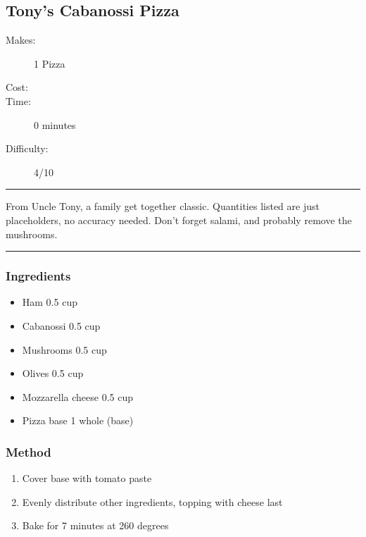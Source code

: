 \documentclass[]{article}
\begin{document}
\subsection*{\center\huge Tony's Cabanossi Pizza}
\begin{description}
\item[Makes:] 1 Pizza
\item[Cost:] \textdollar
\item[Time:] 0 minutes
\item[Difficulty:] 4/10
\end{description}
\vspace{0.2cm}\hrule\vspace{0.5cm}
\begin{adjustwidth}{0.5 cm}{0.5 cm}

From Uncle Tony, a family get together classic. Quantities listed are just placeholders, no accuracy needed. Don't forget salami, and probably remove the mushrooms. \hfill\color{accent}{\Large\faGlide\hspace{0.1cm}\faTruck\hspace{0.1cm}}\color{black}

\end{adjustwidth}
\vspace{0.5cm}\hrule
\subsubsection*{\Large Ingredients}
\begin{multicols}{2}
\begin{itemize}
 \item Ham \hfill 0.5 cup
 \item Cabanossi \hfill 0.5 cup
 \item Mushrooms \hfill 0.5 cup
 \item Olives \hfill 0.5 cup
 \item Mozzarella cheese \hfill 0.5 cup
 \item Pizza base \hfill 1 whole (base)
\end{itemize}
\end{multicols}
\subsubsection*{\Large Method}
\begin{enumerate}[font=\huge\color{accent}]
	\item Cover base with tomato paste
	\item Evenly distribute other ingredients, topping with cheese last
	\item Bake for 7 minutes at 260 degrees
\end{enumerate}
\newpage
{}\label{rec:Za'atar Munoushee}
\end{document}
